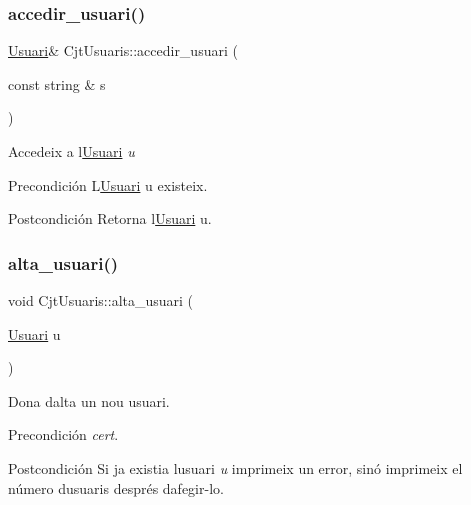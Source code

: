 \subsubsection{\texorpdfstring{accedir\+\_\+usuari()}{accedir\_usuari()}}
{\footnotesize\ttfamily \mbox{\hyperlink{class_usuari}{Usuari}}\& Cjt\+Usuaris\+::accedir\+\_\+usuari (\begin{DoxyParamCaption}\item[{const string \&}]{s }\end{DoxyParamCaption})}



Accedeix a l\textquotesingle{}\mbox{\hyperlink{class_usuari}{Usuari}} {\itshape u} 

\begin{DoxyPrecond}{Precondición}
L\textquotesingle{}\mbox{\hyperlink{class_usuari}{Usuari}} u existeix. 
\end{DoxyPrecond}
\begin{DoxyPostcond}{Postcondición}
Retorna l\textquotesingle{}\mbox{\hyperlink{class_usuari}{Usuari}} u. 
\end{DoxyPostcond}
\mbox{\label{class_cjt_usuaris_a40b8eb64e9dc22e3cf0ee38d52d48e20}} 
\subsubsection{\texorpdfstring{alta\+\_\+usuari()}{alta\_usuari()}}
{\footnotesize\ttfamily void Cjt\+Usuaris\+::alta\+\_\+usuari (\begin{DoxyParamCaption}\item[{\mbox{\hyperlink{class_usuari}{Usuari}}}]{u }\end{DoxyParamCaption})}



Dona d\textquotesingle{}alta un nou usuari. 

\begin{DoxyPrecond}{Precondición}
{\itshape cert}. 
\end{DoxyPrecond}
\begin{DoxyPostcond}{Postcondición}
Si ja existia l\textquotesingle{}usuari {\itshape u} imprimeix un error, sinó imprimeix el número d\textquotesingle{}usuaris després d\textquotesingle{}afegir-\/lo. 
\end{DoxyPostcond}
\mbox{\label{class_cjt_usuaris_a8aa977e92fd28d1c1dd1604ec3ed21e8}} 
